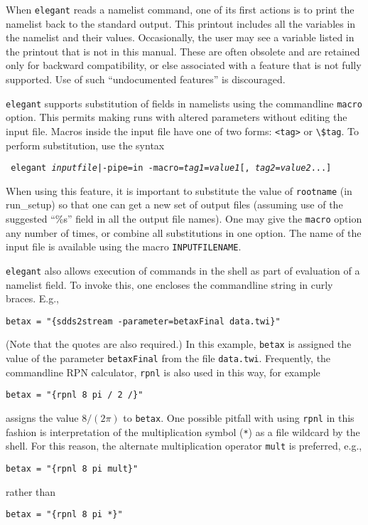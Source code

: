 \documentclass[11pt]{article}
\begin{document}
When {\tt elegant} reads a namelist command, one of its first actions
is to print the namelist back to the standard output.  This printout
includes all the variables in the namelist and their values.
Occasionally, the user may see a variable listed in the printout that
is not in this manual.  These are often obsolete and are retained only
for backward compatibility, or else associated with a feature that is
not fully supported.  Use of such ``undocumented features'' is
discouraged.

{\tt elegant} supports substitution of fields in namelists using the
commandline {\tt macro} option.  This permits making runs with altered
parameters without editing the input file.  Macros inside the input
file have one of two forms: \verb|<tag>| or \verb|\$tag|.  To perform
substitution, use the syntax
\begin{flushleft}{\tt
elegant {{\em inputfile}|-pipe=in} -macro={\em tag1}={\em value1}[,{\em
tag2}={\em value2}...]  }\end{flushleft} 
When using this feature, it
is important to substitute the value of {\tt rootname} (in run\_setup)
so that one can get a new set of output files (assuming use of the
suggested ``\%s'' field in all the output file names).
One may give the {\tt macro} option any number of times, or combine
all substitutions in one option.  The name of the input file is available
using the macro \verb|INPUTFILENAME|.

{\tt elegant} also allows execution of commands in the shell as part of
evaluation of a namelist field.  To invoke this, one encloses the commandline
string in curly braces.  E.g., 
\begin{verbatim}
betax = "{sdds2stream -parameter=betaxFinal data.twi}"
\end{verbatim}
(Note that the quotes are also required.)
In this example, \verb|betax| is assigned the value of the parameter {\tt betaxFinal} from
the file {\tt data.twi}.
Frequently, the commandline RPN calculator, {\tt rpnl} is also used in this way, for example
\begin{verbatim}
betax = "{rpnl 8 pi / 2 /}"
\end{verbatim}
assigns the value $8/(2 \pi)$ to {\tt betax}. One possible pitfall with using \verb|rpnl| in this
fashion is interpretation of the multiplication symbol (\verb|*|) as a file wildcard by the
shell.  For this reason, the alternate multiplication operator \verb|mult| is preferred, e.g.,
\begin{verbatim}
betax = "{rpnl 8 pi mult}"
\end{verbatim}
rather than
\begin{verbatim}
betax = "{rpnl 8 pi *}"
\end{verbatim}
\end{document}
